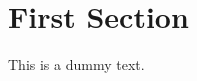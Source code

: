 \documentclass[english,cdenglish]{univie-ling-handout}
\begin{document}
\maketitle

\section{First Section}

This is a dummy text.
\end{document}
